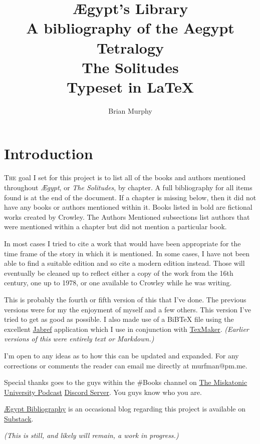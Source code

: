 \documentclass[10pt,makeidx]{extreport}
\author{Brian Murphy}
\title{
 {\Huge Ægypt's Library} \\
 {\footnotesize A bibliography of the Aegypt Tetralogy \\
 \bigskip
 {\Large The Solitudes} \\
 \bigskip
 Typeset in \LaTeX{} \\
 }
}
\date{\begin{small}\today{}\end{small}}
\newcommand\dropcap{\lettrine[lines=4, findent=3pt]}
\newcommand\fleuron{\begin{turn}{45}\Large \ding{166}\end{turn}}
\newcommand\doublefleuron{%
	\reflectbox{\fleuron}\AC\staveXLIX\reflectbox{\AC}\fleuron}
\newcommand\fleuronbar{%
	{\huge\LinearACCCXIII}\xrfill[1.3ex]{1pt}\doublefleuron\xrfill[1.3ex]{1pt}\reflectbox{\huge\LinearACCCXIII}}
\newcommand\blankpage{%
    \null
    \thispagestyle{empty}%
    \addtocounter{page}{-1}%
    \newpage%
    \pagestyle{fancy}}
\newcommand\nbvspace[1][3]{\vspace*{\stretch{#1}}}
\begin{document}




\setcounter{tocdepth}{1}
\tableofcontents

\pagestyle{fancy}
\chapter{\color{Mahogany}Introduction}
\dropcap{T}{he} goal I set for this project is to list all of the books and authors mentioned throughout \textit{Ægypt}, or \textit{The Solitudes}, by chapter. A full bibliography for all items found is at the end of the document. If a chapter is missing below, then it did not have any books or authors mentioned within it. Books listed in bold are fictional works created by Crowley. The Authors Mentioned subsections list authors that were mentioned within a chapter but did not mention a particular book.

In most cases I tried to cite a work that would have been appropriate for the time frame of the story in which it is mentioned. In some cases, I have not been able to find a suitable edition and so cite a modern edition instead. Those will eventually be cleaned up to reflect either a copy of the work from the 16th century, one up to 1978, or one available to Crowley while he was writing.

This is probably the fourth or fifth version of this that I've done. The previous versions were for my the enjoyment of myself and a few others. This version I've tried to get as good as possible. I also made use of a {BiBTeX} file using the excellent \href{https://www.jabref.org/}{Jabref} application which I use in conjunction with \href{https://www.xm1math.net/texmaker/}{TexMaker}. \textit{(Earlier versions of this were entirely text or Markdown.)} 

I'm open to any ideas as to how this can be updated and expanded. For any corrections or comments the reader can email me directly at murfman@pm.me.

Special thanks goes to the guys within the \#Books channel on \href{https://www.mu-podcast.com}{The Miskatonic University Podcast} \href{https://discord.gg/5nH7UqtpdM}{Discord Server}. You guys know who you are.

\href{https://aegyptbibliography.substack.com}{Ægypt Bibliography} is an occasional blog regarding this project is available on \href{www.substack.com}{Substack}.
\bigskip
\begin{center}
\textit{(This is still, and likely will remain, a work in progress.)}

\vfill
\shadowoffset{1pt}
\shadowtext{%
{\color{Mahogany}\fontsize{64}{64}\Venus}}\\
\nbvspace[1]
\end{center}
\end{document}
